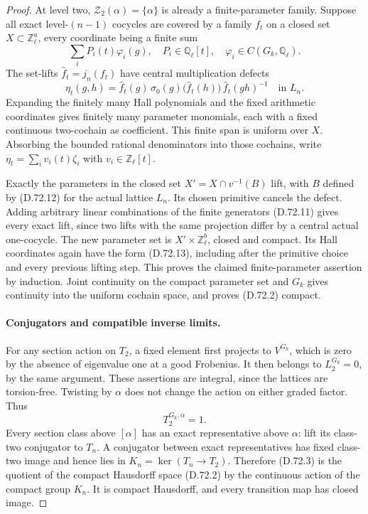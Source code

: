 \begin{proof}
At level two, \(\mathscr Z_2(\alpha)=\{\alpha\}\)
is already a finite-parameter family. Suppose
all exact level-\((n-1)\) cocycles are covered
by a family \(f_t\) on a closed set
\(X\subset\mathbb Z_\ell^a\), every coordinate
being a finite sum
\[
             \sum_i P_i(t)\varphi_i(g),
      \quad P_i\in\mathbb Q_\ell[t],\quad
             \varphi_i\in C(G_k,\mathbb Q_\ell).
                                                        \tag{D.72.13}
\]
The set-lifts \(\widehat f_t=j_n(f_t)\) have
central multiplication defects
\[
 \eta_t(g,h)=\widehat f_t(g)\,
     \sigma_0(g)\bigl(\widehat f_t(h)\bigr)\,
                           \widehat f_t(gh)^{-1}
                       \quad\text{in }L_n.             \tag{D.72.14}
\]
Expanding the finitely many Hall polynomials
and the fixed arithmetic coordinates gives
finitely many parameter monomials, each with
a fixed continuous two-cochain as coefficient.
This finite span is uniform over \(X\).
Absorbing the bounded rational denominators
into those cochains, write
\(\eta_t=\sum_i v_i(t)\zeta_i\) with
\(v_i\in\mathbb Z_\ell[t]\).

Exactly the parameters in the closed set
\(X'=X\cap v^{-1}(B)\) lift, with \(B\)
defined by (D.72.12) for the actual lattice
\(L_n\). Its chosen primitive cancels the
defect. Adding arbitrary linear combinations
of the finite generators (D.72.11) gives
every exact lift, since two lifts with the
same projection differ by a central actual
one-cocycle. The new parameter set is
\(X'\times\mathbb Z_\ell^b\), closed and compact.
Its Hall coordinates again have the form
(D.72.13), including after the primitive
choice and every previous lifting step.
This proves the claimed finite-parameter
assertion by induction. Joint continuity
on the compact parameter set and \(G_k\)
gives continuity into the uniform cochain
space, and proves (D.72.2) compact.

\paragraph{Conjugators and compatible inverse limits.}
For any section action on \(T_2\), a fixed
element first projects to \(V^{G_k}\), which
is zero by the absence of eigenvalue one
at a good Frobenius. It then belongs to
\(L_2^{G_k}=0\), by the same argument.
These assertions are integral, since the
lattices are torsion-free. Twisting by
\(\alpha\) does not change the action on
either graded factor. Thus
\[
                       T_2^{G_k,\alpha}=1.             \tag{D.72.15}
\]
Every section class above \([\alpha]\)
has an exact representative above \(\alpha\):
lift its class-two conjugator to \(T_n\).
A conjugator between exact representatives
has fixed class-two image and hence lies
in \(K_n=\ker(T_n\to T_2)\).
Therefore (D.72.3) is the quotient of
the compact Hausdorff space (D.72.2)
by the continuous action of the compact
group \(K_n\). It is compact Hausdorff,
and every transition map has closed image.


\end{proof}
